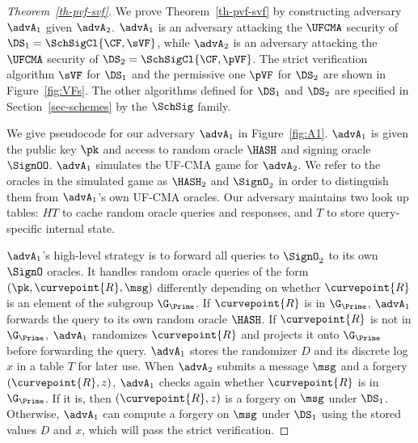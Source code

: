 \begin{proof}[Theorem~\ref{th-pvf-svf}]
	
	We prove Theorem~\ref{th-pvf-svf} by constructing adversary $\advA_1$ given $\advA_2$.  $\advA_1$ is an adversary attacking the $\UFCMA$ security of $\DS_1= \SchSigCl{\CF,\sVF}$, while $\advA_2$ is an adversary attacking the $\UFCMA$ security of $\DS_2= \SchSigCl{\CF,\pVF}$. The strict verification algorithm $\sVF$ for $\DS_1$ and the permissive one $\pVF$ for  $\DS_2$ are shown in Figure~\ref{fig:VFs}. The other algorithms defined for $\DS_1$ and $\DS_2$ are specified in Section~\ref{sec-schemes} by the $\SchSig$ family.
	
	We give pseudocode for our adversary $\advA_1$ in Figure~\ref{fig:A1}. $\advA_1$ is given the public key $\pk$ and access to random oracle $\HASH$ and signing oracle $\SignOO$. $\advA_1$ simulates the UF-CMA game for $\advA_2$. We refer to the oracles in the simulated game as $\HASH_2$ and $\SignO_2$ in order to distinguish them from $\advA_1$'s own UF-CMA oracles. Our adversary maintains two look up tables: $HT$ to cache random oracle queries and responses, and $T$ to store query-specific internal state.
	
	$\advA_1$'s high-level strategy is to forward all queries to $\SignO_2$ to its own $\SignO$ oracles. It handles random oracle queries of the form $(\pk, \curvepoint{R}, \msg)$ differently depending on whether $\curvepoint{R}$ is an element of the subgroup $\G_\Prime$. If $\curvepoint{R}$ is in $\G_\Prime$, $\advA_1$ forwards the query to its own random oracle $\HASH$. If $\curvepoint{R}$ is not in $\G_\Prime$, $\advA_1$ randomizes $\curvepoint{R}$ and projects it onto $\G_\Prime$ before forwarding the query. $\advA_1$ stores the randomizer $D$ and its discrete log $x$ in a table $T$ for later use. When $\advA_2$ submits a message $\msg$ and a forgery $(\curvepoint{R}, z)$, $\advA_1$ checks again whether $\curvepoint{R}$ is in $\G_\Prime$. If it is, then $(\curvepoint{R}, z)$ is a forgery on $\msg$ under $\DS_1$. Otherwise, $\advA_1$ can compute a forgery on $\msg$ under $\DS_1$ using the stored values $D$ and $x$, which will pass the strict verification.
	

\end{proof}
